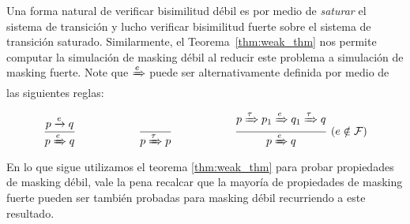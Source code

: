 Una forma natural de verificar bisimilitud débil es por medio de \emph{saturar}
el sistema de transición  \cite{FernandezM91,Milner89} y lucho verificar bisimilitud fuerte sobre el sistema de transición saturado.
Similarmente, el Teorema~\ref{thm:weak_thm} nos permite computar la simulación de masking débil al reducir este problema a simulación de masking fuerte. Note que $\xRightarrow{e}$ puede ser alternativamente definida por medio de las siguientes reglas:

\[
\dfrac{p \xrightarrow{e} q}{p\xRightarrow{e} q} \hspace{2cm} 
\dfrac{}{p\xRightarrow{\tau} p} \hspace{2cm} 
\dfrac{p\xRightarrow{\tau} p_1 \xRightarrow{e} q_1 \xRightarrow{\tau} q}{p\xRightarrow{e} q}~(e \notin \mathcal{F})
\]
	En lo que sigue utilizamos el teorema \ref{thm:weak_thm} para probar propiedades de masking débil, vale la pena recalcar que la mayoría de propiedades de masking fuerte pueden ser también probadas para masking débil recurriendo a este resultado.

